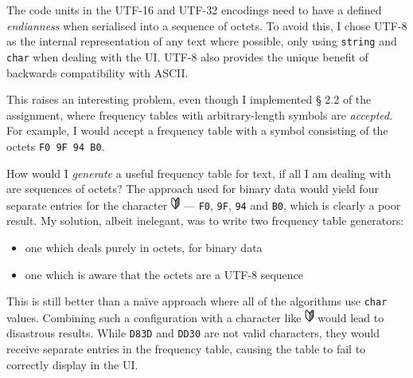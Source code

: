 \documentclass[a4paper,titlepage,12pt]{article}
\begin{document}
The code units in the UTF-16 and UTF-32 encodings need to have a defined
\emph{endianness} when serialised into a sequence of octets. To avoid this, I
chose UTF-8 as the internal representation of any text where possible, only
using \texttt{string} and \texttt{char} when dealing with the UI. UTF-8 also
provides the unique benefit of backwards compatibility with ASCII.

This raises an interesting problem, even though I implemented § 2.2 of the
assignment, where frequency tables with arbitrary-length symbols are
\emph{accepted}. For example, I would accept a frequency table with a symbol
consisting of the octets \texttt{F0 9F 94 B0}.

How would I \emph{generate} a useful frequency table for text, if all I am
dealing with are sequences of octets? The approach used for binary data would
yield four separate entries for the character \includegraphics[height=12pt]
{U+01F530.png} --- \texttt{F0}, \texttt{9F}, \texttt{94} and \texttt{B0}, which
is clearly a poor result. My solution, albeit inelegant, was to write two
frequency table generators:

\begin{itemize}
	\item
		one which deals purely in octets, for binary data
	\item
		one which is aware that the octets are a UTF-8 sequence
\end{itemize}

This is still better than a naïve approach where all of the algorithms use
\texttt{char} values. Combining such a configuration with a character like
\includegraphics[height=12pt]{U+01F530.png} would lead to disastrous results.
While \texttt{D83D} and \texttt{DD30} are not valid characters, they would
receive separate entries in the frequency table, causing the table to fail to
correctly display in the UI.
\end{document}
